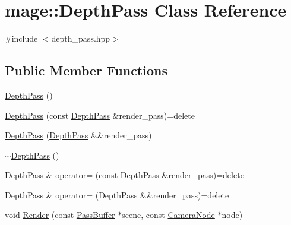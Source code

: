 \hypertarget{classmage_1_1_depth_pass}{}\section{mage\+:\+:Depth\+Pass Class Reference}
\label{classmage_1_1_depth_pass}


{\ttfamily \#include $<$depth\+\_\+pass.\+hpp$>$}

\subsection*{Public Member Functions}
\begin{DoxyCompactItemize}
\item 
\hyperlink{classmage_1_1_depth_pass_a16a23f6820a11faf9195b307474e355b}{Depth\+Pass} ()
\item 
\hyperlink{classmage_1_1_depth_pass_a9f0376b1423404dcced29535d59dd18c}{Depth\+Pass} (const \hyperlink{classmage_1_1_depth_pass}{Depth\+Pass} \&render\+\_\+pass)=delete
\item 
\hyperlink{classmage_1_1_depth_pass_af5755a8ee09bc528c0644f657558d71f}{Depth\+Pass} (\hyperlink{classmage_1_1_depth_pass}{Depth\+Pass} \&\&render\+\_\+pass)
\item 
\hyperlink{classmage_1_1_depth_pass_adc89d5da94b42294316d4ad1dfa09eb4}{$\sim$\+Depth\+Pass} ()
\item 
\hyperlink{classmage_1_1_depth_pass}{Depth\+Pass} \& \hyperlink{classmage_1_1_depth_pass_ac84074238d8ce69251fc2e6f294c5898}{operator=} (const \hyperlink{classmage_1_1_depth_pass}{Depth\+Pass} \&render\+\_\+pass)=delete
\item 
\hyperlink{classmage_1_1_depth_pass}{Depth\+Pass} \& \hyperlink{classmage_1_1_depth_pass_ab6a7d2abf0876f84591328d448ac1203}{operator=} (\hyperlink{classmage_1_1_depth_pass}{Depth\+Pass} \&\&render\+\_\+pass)=delete
\item 
void \hyperlink{classmage_1_1_depth_pass_af4776381c4271e464b0fd72c7437922d}{Render} (const \hyperlink{structmage_1_1_pass_buffer}{Pass\+Buffer} $\ast$scene, const \hyperlink{classmage_1_1_camera_node}{Camera\+Node} $\ast$node)
\end{DoxyCompactItemize}
